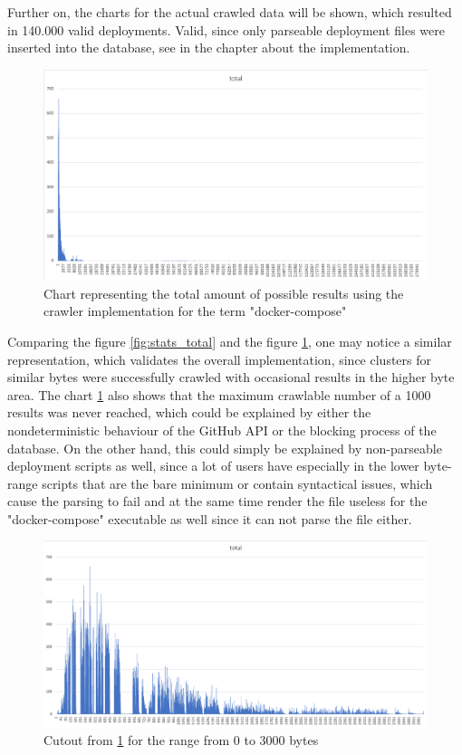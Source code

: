 Further on, the charts for the actual crawled data will be shown, which resulted in 140.000 valid deployments. Valid, since only parseable deployment files were inserted into the database, see  in the chapter about the implementation.

\begin{figure}[H]
    \centering
    \includegraphics[scale=0.5]{graphics/deployment_stats_total.png}
    \caption{Chart representing the total amount of possible results using the crawler implementation for the term "docker-compose"}
    \label{fig:deployment_total}
\end{figure}

Comparing the figure \ref{fig:stats_total} and the figure \ref{fig:deployment_total}, one may notice a similar representation, which validates the overall implementation, since clusters for similar bytes were successfully crawled with occasional results in the higher byte area.
The chart \ref{fig:deployment_total} also shows that the maximum crawlable number of a 1000 results was never reached, which could be explained by either the nondeterministic behaviour of the GitHub API or the blocking process of the database. On the other hand, this could simply be explained by non-parseable deployment scripts as well, since a lot of users have especially in the lower byte-range scripts that are the bare minimum or contain syntactical issues, which cause the parsing to fail and at the same time render the file useless for the "docker-compose" executable as well since it can not parse the file either.

\begin{figure}[H]
    \centering
    \includegraphics[scale=0.5]{graphics/deployment_stats_range.png}
    \caption{Cutout from \ref{fig:deployment_total} for the range from 0 to 3000 bytes}
    \label{fig:deployment_range}
\end{figure}

